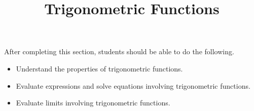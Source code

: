 \documentclass{ximera}
\title{Trigonometric Functions}
\begin{document}
\begin{abstract} 
\end{abstract}

\maketitle

\begin{sectionOutcomes}
After completing this section, students should be able to do the following.

\begin{itemize}
	\item Understand the properties of trigonometric functions.
	\item Evaluate expressions and solve equations involving
          trigonometric functions.
         \item Evaluate limits involving trigonometric functions.
\end{itemize}
\end{sectionOutcomes}
\end{document}
